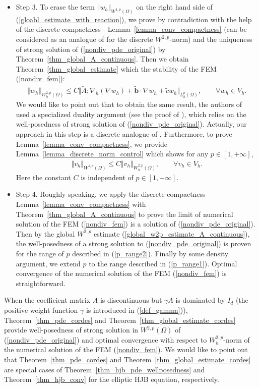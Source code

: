 \documentclass[12pt]{amsart}
\theoremstyle{definition}
\theoremstyle{remark}
\begin{document}
\begin{itemize}
\item Step $3$. To erase the term $\Vert w_{h}\Vert_{W^{1,p}(\Omega)}$ on the right hand side of 
(\ref{gloabl_estimate_with_reaction}), we prove by contradiction with the help of 
the discrete compactness - Lemma~\ref{lemma_conv_compactness} (can be considered as an analogue of 
\cite[Theorem~$5.2$]{BuffaOrtner2009} for the discrete $W^{2,p}$-norm) and the uniqueness of 
strong solution of (\ref{nondiv_pde_original}) by Theorem~\ref{thm_global_A_continuous}. Then we obtain 
Theorem~\ref{thm_global_estimate} which the stability of the FEM (\ref{nondiv_fem}):
\begin{align*}
\Vert w_{h} \Vert_{W_{h}^{2,p}(\Omega)} \leq C \Vert \tilde{A}: \overline{\nabla}_{h}(\nabla w_{h}) +\tilde{\boldsymbol{b}}\cdot\nabla w_{h} + \tilde{c} w_{h}\Vert_{L_{h}^{p}(\Omega)}, 
\qquad \forall w_{h} \in V_{h}.
\end{align*}
We would like to point out that to obtain the same result, the authors of \cite{FHM2017} used a specialized duality 
argument (see the proof of \cite[Lemma~$3.5$]{FHM2017}), which relies on the well-posedness of strong solution of 
(\ref{nondiv_pde_original}). Actually, our approach in this step is a discrete analogue of \cite[Lemma~$9.17$]{GT01}.
Furthermore, to prove Lemma~\ref{lemma_conv_compactness}, 
we provide Lemma~\ref{lemma_discrete_norm_control} which shows for any $p \in [1, + \infty]$, 
\begin{align*}
\Vert v_{h}\Vert_{W^{1,p}(\Omega)} \leq C \Vert v_{h}\Vert_{W_{h}^{2,p}(\Omega)}, 
\qquad \forall v_{h} \in V_{h}.
\end{align*}
Here the constant $C$ is independent of $p \in [1, + \infty]$.

\item Step $4$. Roughly speaking, we apply the discrete compactness - Lemma~\ref{lemma_conv_compactness} with 
Theorem~\ref{thm_global_A_continuous} to prove the limit of numerical solution of the FEM (\ref{nondiv_fem}) is 
a solution of (\ref{nondiv_pde_original}). Then by the global $W^{2,p}$ estimate (\ref{global_w2p_estimate_A_continuous}), 
the well-posedness of a strong solution to (\ref{nondiv_pde_original}) is proven for the range of $p$ 
described in (\ref{p_range2}). Finally by some density argument, we extend $p$ to the range described in (\ref{p_range1}).  
Optimal convergence of the numerical solution of the FEM (\ref{nondiv_fem}) is straightforward. 
\end{itemize}

When the coefficient matrix $A$ is discontinuous but $\gamma A$ is dominated by $I_{d}$ (the positive 
weight function $\gamma$ is introduced in (\ref{def_gamma})), Theorem~\ref{thm_pde_cordes} and 
Theorem~\ref{thm_global_estimate_cordes} provide well-posedness of strong solution in $W^{2,p}(\Omega)$ 
of (\ref{nondiv_pde_original}) and optimal convergence with respect to $W_{h}^{2,p}$-norm of the numerical 
solution of the FEM (\ref{nondiv_fem}). We would like to point out that Theorem~\ref{thm_pde_cordes} and 
Theorem~\ref{thm_global_estimate_cordes} are special cases of Theorem~\ref{thm_hjb_pde_wellposedness} 
and Theorem~\ref{thm_hjb_conv} for the elliptic HJB equation, respectively. 
\end{document}
